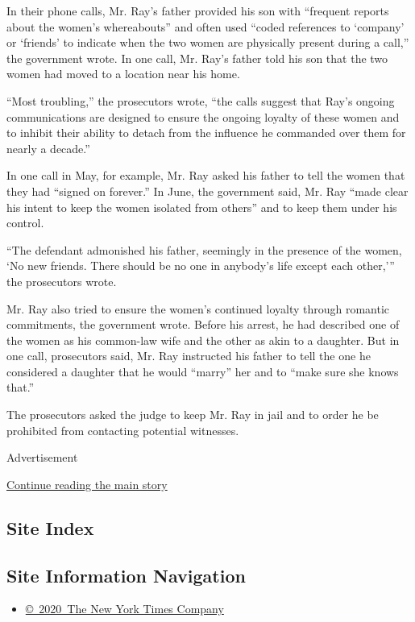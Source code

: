 In their phone calls, Mr. Ray's father provided his son with ``frequent
reports about the women's whereabouts'' and often used ``coded
references to `company' or `friends' to indicate when the two women are
physically present during a call,'' the government wrote. In one call,
Mr. Ray's father told his son that the two women had moved to a location
near his home.

``Most troubling,'' the prosecutors wrote, ``the calls suggest that
Ray's ongoing communications are designed to ensure the ongoing loyalty
of these women and to inhibit their ability to detach from the influence
he commanded over them for nearly a decade.''

In one call in May, for example, Mr. Ray asked his father to tell the
women that they had ``signed on forever.'' In June, the government said,
Mr. Ray ``made clear his intent to keep the women isolated from others''
and to keep them under his control.

``The defendant admonished his father, seemingly in the presence of the
women, `No new friends. There should be no one in anybody's life except
each other,''' the prosecutors wrote.

Mr. Ray also tried to ensure the women's continued loyalty through
romantic commitments, the government wrote. Before his arrest, he had
described one of the women as his common-law wife and the other as akin
to a daughter. But in one call, prosecutors said, Mr. Ray instructed his
father to tell the one he considered a daughter that he would ``marry''
her and to ``make sure she knows that.''

The prosecutors asked the judge to keep Mr. Ray in jail and to order he
be prohibited from contacting potential witnesses.

Advertisement

\protect\hyperlink{after-bottom}{Continue reading the main story}

\hypertarget{site-index}{%
\subsection{Site Index}\label{site-index}}

\hypertarget{site-information-navigation}{%
\subsection{Site Information
Navigation}\label{site-information-navigation}}

\begin{itemize}
\tightlist
\item
  \href{https://help.nytimes3xbfgragh.onion/hc/en-us/articles/115014792127-Copyright-notice}{©~2020~The
  New York Times Company}
\end{itemize}

